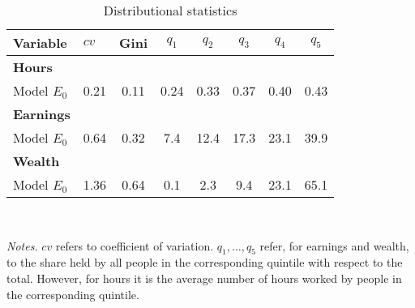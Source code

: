 \begin{table}[!htbp]
\centering
\caption{Distributional statistics}
\begin{tabular}{llcccccc}
\toprule
Variable & $cv$ & Gini & $q_1$ & $q_2$ & $q_3$ & $q_4$ & $q_5$ \\
\midrule
\textbf{Hours} &   &  &   &  &  &  &  \\
Model $E_0$ & 0.21 & 0.11 & 0.24 & 0.33 & 0.37 & 0.40 & 0.43 \\
\addlinespace
\textbf{Earnings} &   &  &   &  &  &  &  \\
Model $E_0$ & 0.64 & 0.32 & 7.4 & 12.4 & 17.3 & 23.1 & 39.9 \\
\addlinespace
\textbf{Wealth} &   &  &   &  &  &  &  \\
Model $E_0$ & 1.36 & 0.64 & 0.1 & 2.3 & 9.4 & 23.1 & 65.1 \\
\bottomrule
\end{tabular}
\\[3ex]
\raggedright\footnotesize{\textit{Notes.} $cv$ refers to coefficient of variation. $q_1, \dots, q_5$ refer, for earnings and wealth, to the share held by all people in the corresponding quintile with respect to the total. However, for hours it is the average number of hours worked by people in the corresponding quintile.}\\
\normalsize
\end{table}
